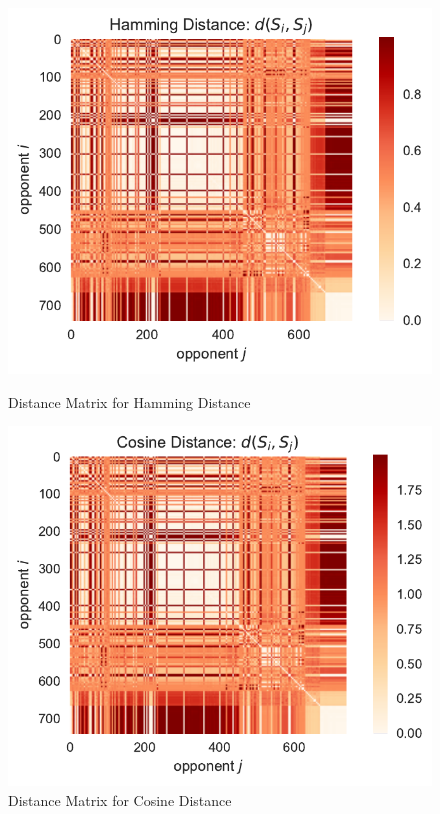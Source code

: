 \begin{figure}[ht]
    \centering
    \begin{minipage}{0.48\textwidth}
        \centering
        \includegraphics[width=1.0\textwidth, center]{./img/dist_matrix/dist_ham.pdf}
        \caption{Distance Matrix for Hamming Distance}\label{fig:dist_ham}
    \end{minipage}\hfill
    \begin{minipage}{0.48\textwidth}
        \includegraphics[width=1.0\textwidth]{./img/dist_matrix/dist_cos.pdf} 
        \caption{Distance Matrix for Cosine Distance}\label{fig:dist_cos}
    \end{minipage}
\end{figure}

